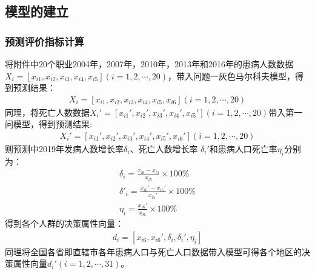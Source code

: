 \documentclass{whutmod}
\begin{document}
    \subsection{模型的建立}
    \subsubsection{预测评价指标计算}
    将附件中$20$个职业2004年，2007年，2010年，2013年和2016年的患病人数数据$X_{i}=[x_{i1},x_{i2},x_{i3},x_{i4},x_{i5}](i=1,2,\cdots,20)$，带入问题一灰色马尔科夫模型，得到预测结果：
    \begin{gather}
    X_{i}=[x_{i1},x_{i2},x_{i3},x_{i4},x_{i5},x_{i6}](i=1,2,\cdots,20)
    \end{gather}
    同理，将死亡人数数据$X_{i}'=[x_{i1}',x_{i2}',x_{i3}',x_{i4}',x_{i5}'](i=1,2,\cdots,20)$带入第一问模型，得到预测结果:
    \begin{gather}
    X_{i}'=[x_{i1}',x_{i2}',x_{i3}',x_{i4}',x_{i5}',x_{i6}'](i=1,2,\cdots,20)
    \end{gather}
    则预测中2019年发病人数增长率$ \delta_{i}$、死亡人数增长率 $ \delta _{i}'$和患病人口死亡率$\eta_{i}$分别为：
    \begin{gather}
    \delta _{i}=\frac{x_{i6}-x_{i5}}{x_{i5}} \times 100\%\\
    \delta '_{i} =\frac{x_{i6}'-x_{i5}'}{x_{i5}'} \times 100\%\\
    \eta_{i} =\frac{x_{i6}'}{x_{i6}} \times 100\%
    \end{gather}
    得到各个人群的决策属性向量：
    \begin{gather}
    d_{i}=[x_{i6},x_{i6}', \delta_{i} , \delta _{i}',\eta_{i} ]
    \end{gather}
    同理将全国各省即直辖市各年患病人口与死亡人口数据带入模型可得各个地区的决策属性向量$d_{i}'(i=1,2,\cdots,31)$。
\end{document}
